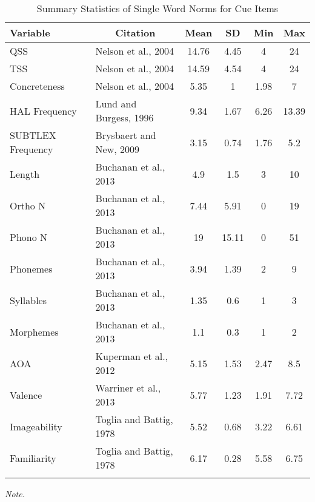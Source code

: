 \documentclass[english,man]{apa6}
\theoremstyle{definition}
\theoremstyle{definition}
\theoremstyle{definition}
\theoremstyle{remark}
\begin{document}
\begin{table}[tbp]
\begin{center}
\begin{threeparttable}
\caption{\label{tab:unnamed-chunk-2}Summary Statistics of Single Word Norms for Cue Items}
\begin{tabular}{llcccc}
\toprule
Variable & \multicolumn{1}{c}{Citation} & \multicolumn{1}{c}{Mean} & \multicolumn{1}{c}{SD} & \multicolumn{1}{c}{Min} & \multicolumn{1}{c}{Max}\\
\midrule
QSS & Nelson et al., 2004 & 14.76 & 4.45 & 4 & 24\\
TSS & Nelson et al., 2004 & 14.59 & 4.54 & 4 & 24\\
Concreteness & Nelson et al., 2004 & 5.35 & 1 & 1.98 & 7\\
HAL Frequency & Lund and Burgess, 1996 & 9.34 & 1.67 & 6.26 & 13.39\\
SUBTLEX Frequency & Brysbaert and New, 2009 & 3.15 & 0.74 & 1.76 & 5.2\\
Length & Buchanan et al., 2013 & 4.9 & 1.5 & 3 & 10\\
Ortho N & Buchanan et al., 2013 & 7.44 & 5.91 & 0 & 19\\
Phono N & Buchanan et al., 2013 & 19 & 15.11 & 0 & 51\\
Phonemes & Buchanan et al., 2013 & 3.94 & 1.39 & 2 & 9\\
Syllables & Buchanan et al., 2013 & 1.35 & 0.6 & 1 & 3\\
Morphemes & Buchanan et al., 2013 & 1.1 & 0.3 & 1 & 2\\
AOA & Kuperman et al., 2012 & 5.15 & 1.53 & 2.47 & 8.5\\
Valence & Warriner et al., 2013 & 5.77 & 1.23 & 1.91 & 7.72\\
Imageability & Toglia and Battig, 1978 & 5.52 & 0.68 & 3.22 & 6.61\\
Familiarity & Toglia and Battig, 1978 & 6.17 & 0.28 & 5.58 & 6.75\\
\bottomrule
\addlinespace
\end{tabular}
\begin{tablenotes}[para]
\textit{Note.} 
\end{tablenotes}
\end{threeparttable}
\end{center}
\end{table}
\end{document}

